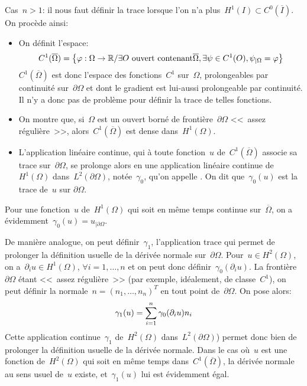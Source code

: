\medskip
Cas~$n>1$:
il nous faut définir la trace lorsque l'on n'a plus~$H^1(I)\subset C^0(\overline{I})$.
On procède ainsi:
\begin{itemize}
  \item On définit l'espace:
	\begin{equation}C^1(\overline{\Omega}) = \left\{\varphi:\Omega\rightarrow\mathbb R/ \exists O
	\text{ ouvert contenant} \overline{\Omega}, \exists \psi\in C^1(O), \psi_{|\Omega}=\varphi
	\right\}\end{equation}
	$C^1(\overline{\Omega})$ est donc l'espace des fonctions~$C^1$ sur~$\Omega$, prolongeables
	par continuité sur~$\partial\Omega$ et dont le gradient est lui-aussi prolongeable par continuité.
	Il n'y a donc pas de problème pour définir la trace de telles fonctions.
  \item On montre que, si~$\Omega$ est un ouvert borné de frontière~$\partial\Omega$
	<<~assez régulière~>>, alors~$C^1(\overline{\Omega})$ est dense dans~$H^1(\Omega)$.
  \item L'application linéaire continue, qui à toute fonction~$u$ de~$C^1(\overline{\Omega})$
	associe sa trace sur~$\partial\Omega$, se prolonge alors en une application linéaire continue
	de~$H^1(\Omega)$ dans~$L^2(\partial\Omega)$, notée~$\gamma_0$, qu'on appelle
	. On dit que~$\gamma_0(u)$ est la trace de~$u$ sur
	$\partial\Omega$.
\end{itemize}
Pour une fonction~$u$ de~$H^1(\Omega)$ qui soit en même temps continue sur~$\overline{\Omega}$,
on a évidemment~$\gamma_0(u) = u_{|\partial\Omega}$. 

\medskip
De manière analogue, on peut définir~$\gamma_1$, l'application trace qui permet de
prolonger la définition usuelle de la dérivée normale sur~$\partial\Omega$.
Pour~$u\in H^2(\Omega)$, on a~$\partial_iu\in H^1(\Omega)$, $\forall i=1,\ldots,n$ et
on peut donc définir~$\gamma_0(\partial_iu)$. La frontière~$\partial\Omega$
étant <<~assez régulière~>> (par exemple, idéalement, de classe~$C^1$),
on peut définir la normale~$n = (n_1,\ldots,n_n)^T$ en tout point de~$\partial\Omega$.
On pose alors:
\begin{equation}\gamma_1(u) = \displaystyle\sum_{i=1}^n \gamma_0(\partial_iu)n_i\end{equation}
Cette application continue~$\gamma_1$ de~$H^2(\Omega)$ dans~$L^2(\partial\Omega)$)
permet donc bien de prolonger la définition usuelle de la dérivée normale.
Dans le cas où~$u$ est une fonction de~$H^2(\Omega)$ qui soit en même temps
dans~$C^1(\overline{\Omega})$, la dérivée normale au sens usuel de~$u$ existe,
et~$\gamma_1(u)$ lui est évidemment égal.

